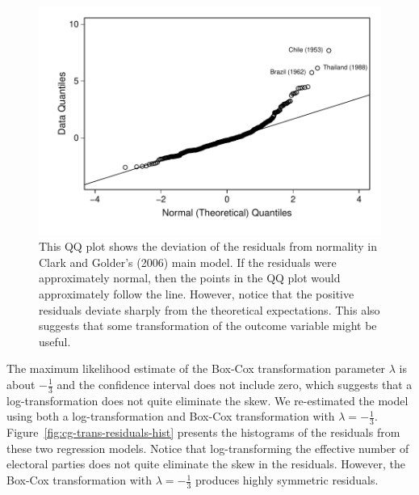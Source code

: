 \documentclass[12pt]{article}
\begin{document}
\begin{figure}[h!]
\begin{center}
	\includegraphics[scale = 0.6]{figs/cg-qq-plot.pdf}
\caption{This QQ plot shows the deviation of the residuals from normality in Clark and Golder's (2006) main model. 
If the residuals were approximately normal, then the points in the QQ plot would approximately follow the line. 
However, notice that the positive residuals deviate sharply from the theoretical expectations. 
This also suggests that some transformation of the outcome variable might be useful.}\label{fig:cg-qq-plot}
\end{center}

\end{figure}

The maximum likelihood estimate of the Box-Cox transformation parameter $\lambda$ is about $-\frac{1}{3}$ and the confidence interval does not include zero, which suggests that a log-transformation does not quite eliminate the skew. 
We re-estimated the model using both a log-transformation and Box-Cox transformation with $\lambda = -\frac{1}{3}$. 
Figure~\ref{fig:cg-trans-residuals-hist} presents the histograms of the residuals from these two regression models. 
Notice that log-transforming the effective number of electoral parties does not quite eliminate the skew in the residuals. However, the Box-Cox transformation with $\lambda = -\frac{1}{3}$ produces highly symmetric residuals. 
\end{document}
